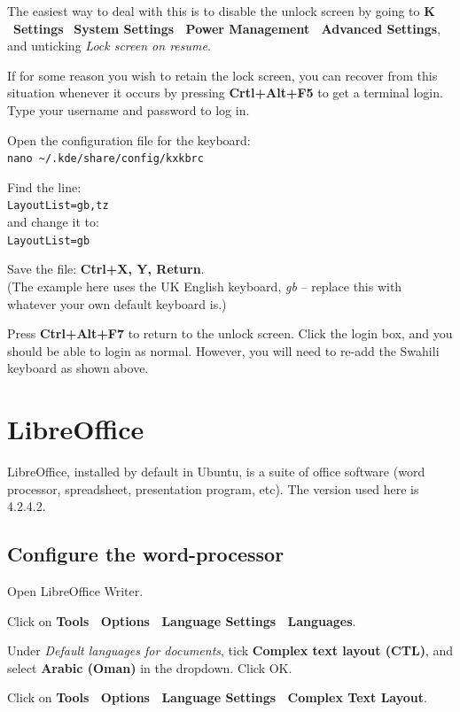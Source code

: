The easiest way to deal with this is to disable the unlock screen by going to \textbf{K} \textrightarrow\ \textbf{Settings} \textrightarrow\ \textbf{System Settings \textrightarrow\ Power Management \textrightarrow\ Advanced Settings}, and unticking \textit{Lock screen on resume}.

If for some reason you wish to retain the lock screen, you can recover from this situation whenever it occurs by pressing \textbf{Crtl+Alt+F5} to get a terminal login.  Type your username and password to log in.

Open the configuration file for the keyboard:\\
\verb|nano ~/.kde/share/config/kxkbrc|

Find the line:\\
\verb|LayoutList=gb,tz|\\
and change it to:\\
\verb|LayoutList=gb|

Save the file: \textbf{Ctrl+X, Y, Return}.\\
(The example here uses the UK English keyboard, \textit{gb} -- replace this with whatever your own default keyboard is.)

Press \textbf{Ctrl+Alt+F7} to return to the unlock screen.  Click the login box, and you should be able to login as normal.  However, you will need to re-add the Swahili keyboard as shown above.


\section{LibreOffice}
\label{s:libreoffice}

LibreOffice, installed by default in Ubuntu, is a suite of office software (word processor, spreadsheet, presentation program, etc).  The version used here is 4.2.4.2.

\subsection{Configure the word-processor}

Open LibreOffice Writer.

Click on \textbf{Tools \textrightarrow\ Options \textrightarrow\ Language Settings \textrightarrow\ Languages}.

Under \textit{Default languages for documents}, tick \textbf{Complex text layout (CTL)}, and select \textbf{Arabic (Oman)} in the dropdown.  Click OK.

Click on \textbf{Tools \textrightarrow\ Options \textrightarrow\ Language Settings \textrightarrow\ Complex Text Layout}.

